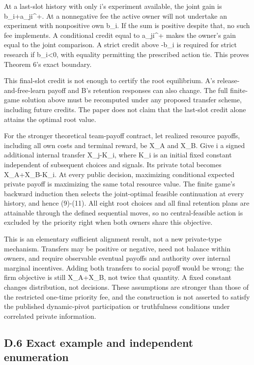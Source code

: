 \documentclass[
  11pt,
]{article}
\begin{document}
At a last-slot history with only i's experiment available, the joint
gain is b\_i+a\_j\textbar i\^{}+. At a nonnegative fee the active owner
will not undertake an experiment with nonpositive own b\_i. If the sum
is positive despite that, no such fee implements. A conditional credit
equal to a\_j\textbar i\^{}+ makes the owner's gain equal to the joint
comparison. A strict credit above -b\_i is required for strict research
if b\_i\textless0, with equality permitting the prescribed action tie.
This proves Theorem 6's exact boundary.

This final-slot credit is not enough to certify the root equilibrium.
A's release-and-free-learn payoff and B's retention responses can also
change. The full finite-game solution above must be recomputed under any
proposed transfer scheme, including future credits. The paper does not
claim that the last-slot credit alone attains the optimal root value.

For the stronger theoretical team-payoff contract, let realized resource
payoffs, including all own costs and terminal reward, be X\_A and X\_B.
Give i a signed additional internal transfer X\_j-K\_i, where K\_i is an
initial fixed constant independent of subsequent choices and signals.
Its private total becomes X\_A+X\_B-K\_i. At every public decision,
maximizing conditional expected private payoff is maximizing the same
total resource value. The finite game's backward induction then selects
the joint-optimal feasible continuation at every history, and hence
(9)-(11). All eight root choices and all final retention plans are
attainable through the defined sequential moves, so no central-feasible
action is excluded by the priority right when both owners share this
objective.

This is an elementary sufficient alignment result, not a new
private-type mechanism. Transfers may be positive or negative, need not
balance within owners, and require observable eventual payoffs and
authority over internal marginal incentives. Adding both transfers to
social payoff would be wrong: the firm objective is still X\_A+X\_B, not
twice that quantity. A fixed constant changes distribution, not
decisions. These assumptions are stronger than those of the restricted
one-time priority fee, and the construction is not asserted to satisfy
the published dynamic-pivot participation or truthfulness conditions
under correlated private information.

\subsection{D.6 Exact example and independent
enumeration}\label{d.6-exact-example-and-independent-enumeration}
\end{document}
